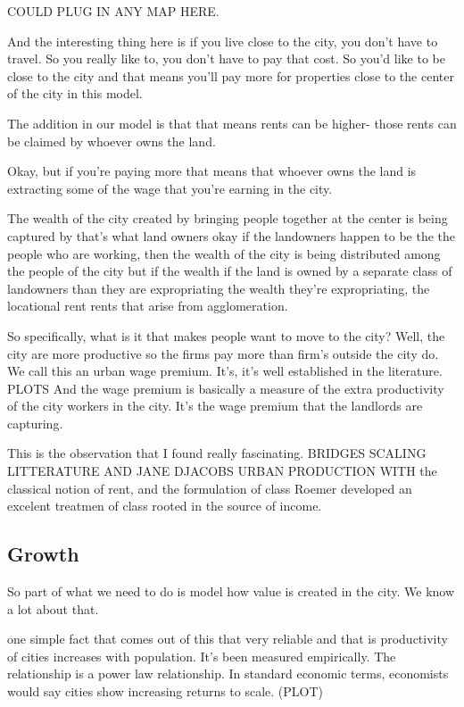 COULD PLUG IN ANY MAP HERE. 

And the  interesting thing here is if you live close to the city, you don't have to travel. So you really like to, you don't have to pay that cost. So you'd like to be close to the city and that means you'll pay more for properties close to the center of the city in this model.

The addition in our model is that that means rents can be higher- those rents can be claimed by whoever owns the land.

Okay, but if you're paying more that means that whoever owns the land is extracting some of the wage that you're earning in the city.

The wealth of the city created by bringing people together at the center is being captured by that's what land owners okay if the landowners happen to be the the people who are working, then the wealth of the city is being distributed among the people of the city but if the wealth if the land is owned by a separate class of landowners than they are expropriating the wealth they're expropriating, the locational rent rents that arise from agglomeration.

So specifically, what is it that makes people want to move to the city? Well, the city are more productive so the firms pay more than  firm's outside the city do.  We call this an urban wage premium. It's, it's well established in the literature. PLOTS
And the wage premium is basically a measure of the extra productivity of the city workers in the city.
It's the wage premium that the landlords are capturing. 


This is the observation that I found really fascinating. 
BRIDGES SCALING LITTERATURE AND JANE DJACOBS URBAN PRODUCTION WITH the classical notion of rent, and the formulation of class Roemer developed an excelent treatmen of class rooted in the source of income. 


\subsection{Growth}
So part of what we need to do is model how value is created in the city. 
We know a lot about that. 

one simple fact that comes out of this that very reliable and that is 
productivity of cities increases with population. It's been measured empirically. The relationship is a power law relationship.
In  standard economic terms, economists would say cities show increasing returns to scale. (PLOT)

